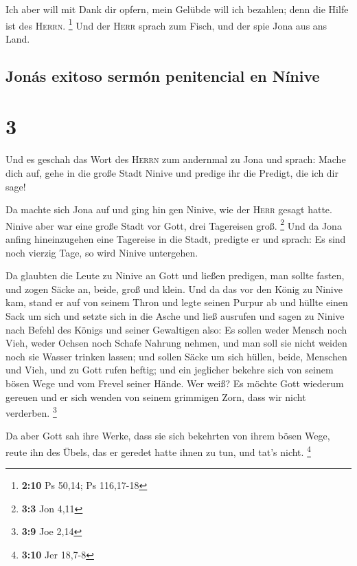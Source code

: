  Ich aber will mit Dank dir opfern, mein Gelübde will ich
bezahlen; denn die Hilfe ist des \textsc{Herrn}. \footnote{\textbf{2:10}
  Ps 50,14; Ps 116,17-18}  Und der \textsc{Herr} sprach
zum Fisch, und der spie Jona aus ans Land.

\hypertarget{jonuxe1s-exitoso-sermuxf3n-penitencial-en-nuxednive}{%
\subsection{Jonás exitoso sermón penitencial en
Nínive}\label{jonuxe1s-exitoso-sermuxf3n-penitencial-en-nuxednive}}

\hypertarget{section-2}{%
\section{3}\label{section-2}}

 Und es geschah das Wort des \textsc{Herrn} zum andernmal
zu Jona und sprach:  Mache dich auf, gehe in die große
Stadt Ninive und predige ihr die Predigt, die ich dir sage!

 Da machte sich Jona auf und ging hin gen Ninive, wie der
\textsc{Herr} gesagt hatte. Ninive aber war eine große Stadt vor Gott,
drei Tagereisen groß. \footnote{\textbf{3:3} Jon 4,11} 
Und da Jona anfing hineinzugehen eine Tagereise in die Stadt, predigte
er und sprach: Es sind noch vierzig Tage, so wird Ninive untergehen.

 Da glaubten die Leute zu Ninive an Gott und ließen
predigen, man sollte fasten, und zogen Säcke an, beide, groß und klein.
 Und da das vor den König zu Ninive kam, stand er auf von
seinem Thron und legte seinen Purpur ab und hüllte einen Sack um sich
und setzte sich in die Asche  und ließ ausrufen und sagen
zu Ninive nach Befehl des Königs und seiner Gewaltigen also: Es sollen
weder Mensch noch Vieh, weder Ochsen noch Schafe Nahrung nehmen, und man
soll sie nicht weiden noch sie Wasser trinken lassen;  und
sollen Säcke um sich hüllen, beide, Menschen und Vieh, und zu Gott rufen
heftig; und ein jeglicher bekehre sich von seinem bösen Wege und vom
Frevel seiner Hände.  Wer weiß? Es möchte Gott wiederum
gereuen und er sich wenden von seinem grimmigen Zorn, dass wir nicht
verderben. \footnote{\textbf{3:9} Joe 2,14}

 Da aber Gott sah ihre Werke, dass sie sich bekehrten von
ihrem bösen Wege, reute ihn des Übels, das er geredet hatte ihnen zu
tun, und tat's nicht. \footnote{\textbf{3:10} Jer 18,7-8}

